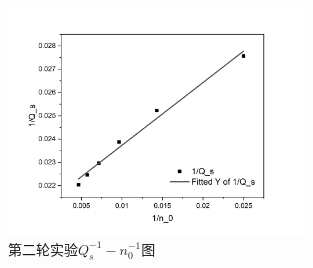 \documentclass[cn,hazy,pku,12pt,normal,math=newtx,cite=super]{elegantnote}
\begin{document}
\begin{figure}[htbp]
    \centering
    \includegraphics[width = 0.70\textwidth]{image/Graph7.png}
    \caption{第二轮实验$Q_s^{-1}-n_0^{-1}$图}\label{5}
\end{figure}
\end{document}
